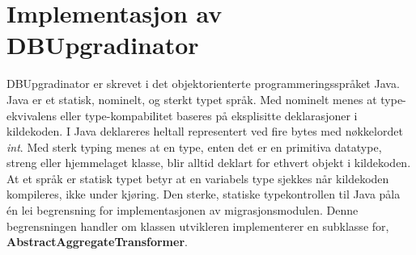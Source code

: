 \section{Implementasjon av DBUpgradinator}

DBUpgradinator er skrevet i det objektorienterte programmeringsspråket Java. Java er et statisk, nominelt, og sterkt typet språk. Med nominelt menes at type-ekvivalens eller type-kompabilitet baseres på eksplisitte deklarasjoner i kildekoden. I Java deklareres heltall representert ved fire bytes med nøkkelordet \emph{int}. Med sterk typing menes at en type, enten det er en primitiva datatype, streng eller hjemmelaget klasse, blir alltid deklart for ethvert objekt i kildekoden. At et språk er statisk typet betyr at en variabels type sjekkes når kildekoden kompileres, ikke under kjøring. Den sterke, statiske typekontrollen til Java påla én lei begrensning for implementasjonen av migrasjonsmodulen. Denne begrensningen handler om klassen utvikleren implementerer en subklasse for, \textbf{AbstractAggregateTransformer}.
